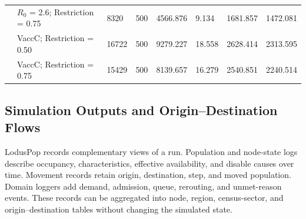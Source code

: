 \documentclass[pdflatex,sn-mathphys-num]{sn-jnl}%
\theoremstyle{thmstyleone}%
\theoremstyle{thmstyletwo}%
\theoremstyle{thmstylethree}%
\begin{document}
\begin{table}[ht]
{\begin{tabular}{@{}clllllll@{}}
                                                                                                                       & $R_0$ = 2.6; Restriction = 0.75      & 8320                                                                         & 500                                                                            & 4566.876                                                                       & 9.134                                                                            & 1681.857                                                                                & 1472.081                                                                                 \\
                                                                                                                       & VaccC; Restriction = 0.50         & 16722                                                                        & 500                                                                            & 9279.227                                                                       & 18.558                                                                           & 2628.414                                                                                & 2313.595                                                                                 \\
                                                                                                                       & VaccC; Restriction = 0.75         & 15429                                                                        & 500                                                                            & 8139.657                                                                       & 16.279                                                                           & 2540.851                                                                                & 2240.514                                                                                 \\ \bottomrule
\end{tabular}
} %
\end{table}



\subsection{Simulation Outputs and Origin--Destination Flows}
LodusPop records complementary views of a run. Population and node-state logs describe occupancy, characteristics, effective availability, and disable causes over time. Movement records retain origin, destination, step, and moved population. Domain loggers add demand, admission, queue, rerouting, and unmet-reason events. These records can be aggregated into node, region, census-sector, and origin--destination tables without changing the simulated state.
\end{document}
